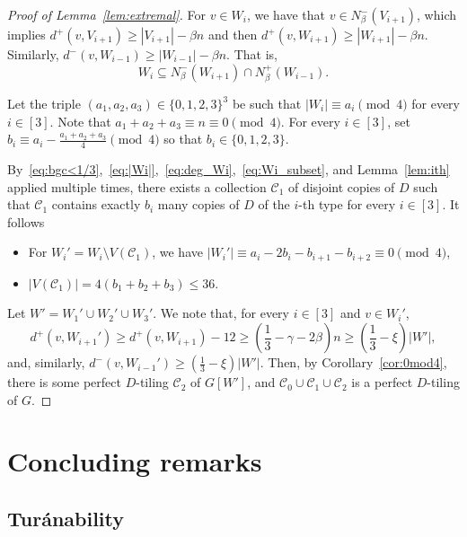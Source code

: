 \documentclass[11pt]{amsart}
\newcommand{\C}{\mathcal{C}}
\begin{document}
\begin{proof}[Proof of Lemma~\ref{lem:extremal}]
    For $v \in W_i$, we have that $v \in N_\beta^-(V_{i+1})$, which implies $d^+(v, V_{i+1}) \ge |V_{i+1}|-\beta n$ and then $d^+(v, W_{i+1}) \ge |W_{i+1}|-\beta n$. Similarly, $d^-(v, W_{i-1}) \ge |W_{i-1}|-\beta n$. That is, 
    \begin{equation} \label{eq:Wi_subset}
        W_i \subseteq N_\beta^-(W_{i+1}) \cap N_\beta^+(W_{i-1}).
    \end{equation}
    
    Let the triple $(a_1,a_2,a_3)\in \{0,1,2,3\}^3$ be such that $|W_i| \equiv a_i \pmod 4$ for every $i \in [3]$. Note that $a_1+a_2+a_3 \equiv n \equiv 0 \pmod 4$. For every $i \in [3]$, set $b_i \equiv a_i - \frac{a_1+a_2+a_3}{4} \pmod 4$ so that $b_i \in \{0,1,2,3\}$.
    
    By~\eqref{eq:bgc<1/3},~\eqref{eq:|Wi|},~\eqref{eq:deg_Wi},~\eqref{eq:Wi_subset}, and Lemma~\ref{lem:ith} applied multiple times, there exists a collection $\C_1$ of disjoint copies of $D$ such that $\C_1$ contains exactly $b_i$ many copies of $D$ of the $i$-th type for every $i\in [3]$.
    It follows
    \begin{itemize}
        \item For $W_i'=W_i\setminus V(\C_1)$, we have $|W_i'| \equiv a_i - 2b_i - b_{i+1} -b_{i+2}\equiv 0\pmod 4$,
        \item $|V(\C_1)| = 4 (b_1+b_2+b_3) \le 36$.
    \end{itemize}

    Let $W'=W_1'\cup W_2'\cup W_3'$. We note that, for every $i\in [3]$ and $v \in W_i'$,
    \begin{equation}
        d^+(v, W_{i+1}') \ge d^+(v, W_{i+1}) - 12 \ge   
        \left( \frac{1}{3} - \gamma - 2\beta \right) n \ge
        \left( \frac{1}{3} - \xi \right) |W'|,
    \end{equation}
    and, similarly, $d^-(v, W_{i-1}')\ge \left( \frac{1}{3} - \xi \right) |W'|$.
    Then, by Corollary~\ref{cor:0mod4}, there is some perfect $D$-tiling $\C_2$ of $G[W']$, and $\C_0 \cup\C_1\cup \C_2$ is a perfect $D$-tiling of $G$.
\end{proof}

\section{Concluding remarks} \label{sec:conclusion}

\subsection{Tur\'anability}
\end{document}
